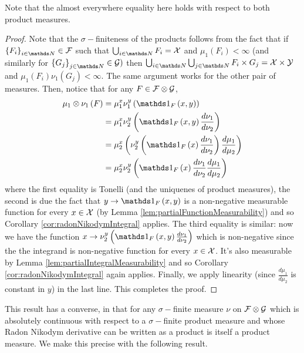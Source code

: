 \begin{rem*}
Note that the almost everywhere equality here holds with respect to
both product measures.
\end{rem*}
\begin{proof}
Note that the $\sigma-$finiteness of the products follows from the
fact that if $\left\{ F_{i}\right\} _{i\in\N}\in\F$ such that $\bigcup_{i\in\N}F_{i}=\X$
and $\mu_{1}\left(F_{i}\right)<\infty$ (and similarly for $\left\{ G_{j}\right\} _{j\in\N}\in\mathcal{G})$
then $\bigcup_{i\in\N}\bigcup_{j\in\N}F_{i}\times G_{j}=\X\times\mathcal{Y}$and
$\mu_{1}\left(F_{i}\right)\nu_{1}\left(G_{j}\right)<\infty$. The
same argument works for the other pair of measures. Then, notice that
for any $F\in\mathcal{F}\otimes\mathcal{G}$, 
\begin{align*}
\mu_{1}\otimes\nu_{1}\left(F\right) & =\mu_{1}^{x}\nu_{1}^{y}\left(\indicate_{F}\left(x,y\right)\right)\\
 & =\mu_{1}^{x}\nu_{2}^{y}\left(\indicate_{F}\left(x,y\right)\frac{d\nu_{1}}{d\nu_{2}}\right)\\
 & =\mu_{2}^{x}\left(\nu_{2}^{y}\left(\indicate_{F}\left(x\right)\frac{d\nu_{1}}{d\nu_{2}}\right)\frac{d\mu_{1}}{d\mu_{2}}\right)\\
 & =\mu_{2}^{x}\nu_{2}^{y}\left(\indicate_{F}\left(x\right)\frac{d\nu_{1}}{d\nu_{2}}\frac{d\mu_{1}}{d\mu_{2}}\right)
\end{align*}
where the first equality is Tonelli (and the uniquenes of product
measures), the second is due the fact that $y\to\indicate_{F}\left(x,y\right)$
is a non-negative measurable function for every $x\in\mathcal{X}$ (by Lemma
\ref{lem:partialFunctionMeasurability}) and so Corollary \ref{cor:radonNikodymIntegral}
applies. The third equality is similar: now we have the function $x\to\nu_{2}^{y}\left(\indicate_{F}\left(x,y\right)\frac{d\nu_{1}}{d\nu_{2}}\right)$
which is non-negative since the the integrand is non-negative function
for every $x\in\mathcal{X}$. It's also measurable by Lemma \ref{lem:partialIntegralMeasurability}
and so Corollary \ref{cor:radonNikodymIntegral} again applies. Finally,
we apply linearity (since $\frac{d\mu_{1}}{d\mu_{2}}$ is constant
in $y$) in the last line. This completes the proof.
\end{proof}
This result has a converse, in that for any $\sigma-$finite measure
$\nu$ on $\mathcal{F}\otimes\mathcal{G}$ which is absolutely continuous with
respect to a $\sigma-$finite product measure and whose Radon Nikodym
derivative can be written as a product is itself a product measure.
We make this precise with the following result.
